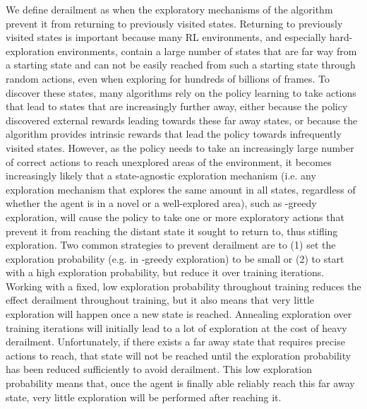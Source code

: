 \documentclass{nature}
\renewcommand*{\cite}[1]{\supercite{#1}}
\begin{document}
We define derailment as when the exploratory mechanisms of the algorithm prevent it from returning to previously visited states.
Returning to previously visited states is important because many RL environments, and especially hard-exploration environments, contain a large number of states that are far way from a starting state and can not be easily reached from such a starting state through random actions, even when exploring for hundreds of billions of frames.
To discover these states, many algorithms rely on the policy learning to take actions that lead to states that are increasingly further away, either because the policy discovered external rewards leading towards these far away states, or because the algorithm provides intrinsic rewards that lead the policy towards infrequently visited states.
However, as the policy needs to take an increasingly large number of correct actions to reach unexplored areas of the environment, it becomes increasingly likely that a state-agnostic exploration mechanism (i.e. any exploration mechanism that explores the same amount in all states, regardless of whether the agent is in a novel or a well-explored area), such as -greedy exploration, will cause the policy to take one or more exploratory actions that prevent it from reaching the distant state it sought to return to, thus stifling exploration.
Two common strategies to prevent derailment are to (1) set the exploration probability (e.g.  in -greedy exploration) to be small or (2) to start with a high exploration probability, but reduce it over training iterations\cite{sutton1998reinforcement}.
Working with a fixed, low exploration probability throughout training reduces the effect derailment throughout training, but it also means that very little exploration will happen once a new state is reached.
Annealing exploration over training iterations will initially lead to a lot of exploration at the cost of heavy derailment. 
Unfortunately, if there exists a far away state that requires precise actions to reach, that state will not be reached until the exploration probability has been reduced sufficiently to avoid derailment.
This low exploration probability means that, once the agent is finally able reliably reach this far away state, very little exploration will be performed after reaching it.
\end{document}
